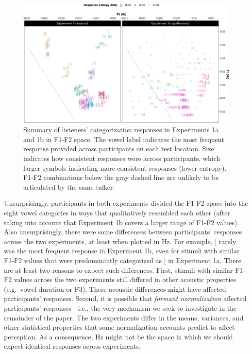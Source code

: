 \documentclass[preprint]{JASA}
\begin{document}
\begin{figure}[!ht]

{\centering \includegraphics[width=0.9\linewidth]{./Figure4} 

}

\caption{Summary of listeners' categorization responses in Experiments 1a and 1b in F1-F2 space. The vowel label indicates the most frequent response provided across participants on each test location. Size indicates how consistent responses were across participants, which larger symbols indicating more consistent responses (lower entropy). F1-F2 combinations below the gray dashed line are unlikely to be articulated by the same talker.}\label{fig:human-performance}
\end{figure}



Unsurprisingly, participants in both experiments divided the F1-F2 space into the eight vowel categories in ways that qualitatively resembled each other (after taking into account that Experiment 1b covers a larger range of F1-F2 values). Also unsurprisingly, there were some differences between participants' responses across the two experiments, at least when plotted in Hz. For example, {[}\textipa{u}{]} rarely was the most frequent response in Experiment 1b, even for stimuli with similar F1-F2 values that were predominantly categorized as {[}\textipa{u}{]} in Experiment 1a. There are at least two reasons to expect such differences. First, stimuli with similar F1-F2 values across the two experiments still differed in other acoustic properties (e.g.~vowel duration or F3). These acoustic differences might have affected participants' responses. Second, it is possible that \emph{formant normalization} affected participants' responses---i.e., the very mechanism we seek to investigate in the remainder of the paper. The two experiments differ in the means, variances, and other statistical properties that some normalization accounts predict to affect perception. As a consequence, Hz might not be the space in which we should expect identical responses across experiments.
\end{document}
